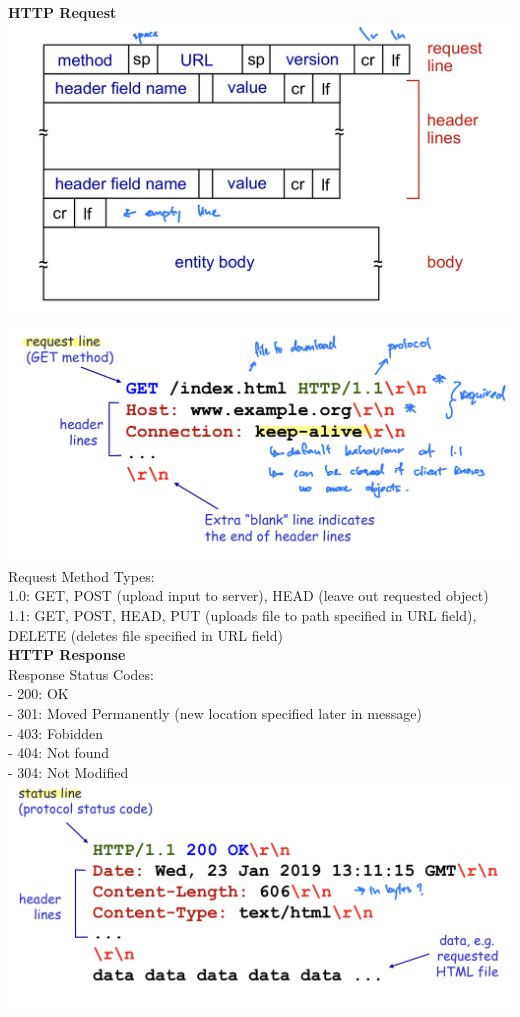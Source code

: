 \documentclass[10pt, a4paper]{article}
\begin{document}
\begin{multicols*}{3}
		\textbf{HTTP Request}\\
		\includegraphics[scale=.14]{./assets/httpRequest}
		\includegraphics[scale=.12]{./assets/httpRequestEg}\\
		Request Method Types:\\
		1.0: GET, POST (upload input to server), HEAD (leave out requested object)\\
		1.1: GET, POST, HEAD, PUT (uploads file to path specified in URL field), DELETE (deletes file specified in URL field)\\

		\textbf{HTTP Response}\\
		Response Status Codes:\\
		- 200: OK\\
		- 301: Moved Permanently (new location specified later in message)\\
		- 403: Fobidden\\
		- 404: Not found\\
		- 304: Not Modified\\
		\includegraphics[scale=.12]{./assets/httpResponseEg}


\end{multicols*}
\end{document}
